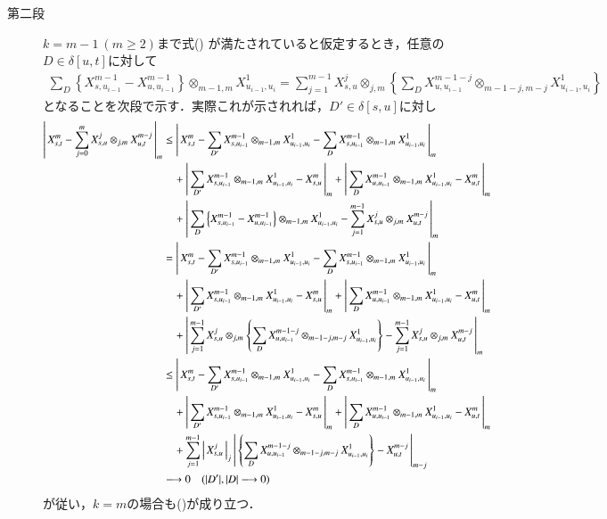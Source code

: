 \begin{prf}
\begin{description}
			\item[第二段]
				$k=m-1\ (m \geq 2)$まで式()
				が満たされていると仮定するとき，任意の$D \in \delta[u,t]$に対して
				\begin{align}
					\sum_D \left\{ X^{m-1}_{s,u_{i-1}} - X^{m-1}_{u,u_{i-1}} \right\} \otimes_{m-1,m} X^1_{u_{i-1},u_i}
					= \sum_{j=1}^{m-1} X^j_{s,u} \otimes_{j,m} \left\{ \sum_D X^{m-1-j}_{u,u_{i-1}} \otimes_{m-1-j,m-j} X^1_{u_{i-1},u_i} \right\}
					\label{eq:thm_signature_of_path_multiplicative_2}
				\end{align}
				となることを次段で示す．実際これが示されれば，$D' \in \delta[s,u]$に対し
				\begin{align}
					\left|\, X^m_{s,t} - \sum_{j=0}^m X^j_{s,u} \otimes_{j,m} X^{m-j}_{u,t}\, \right|_{m}
					&\leq \left|\, X^m_{s,t} - \sum_{D'} X^{m-1}_{s,u_{i-1}} \otimes_{m-1,m} X^1_{u_{i-1},u_i} 
						- \sum_{D} X^{m-1}_{s,u_{i-1}} \otimes_{m-1,m} X^1_{u_{i-1},u_i}\, \right|_{m} \\
						&\quad+ \left|\, \sum_{D'} X^{m-1}_{s,u_{i-1}} \otimes_{m-1,m} X^1_{u_{i-1},u_i} - X^m_{s,u}\, \right|_{m}
						+ \left|\, \sum_{D} X^{m-1}_{u,u_{i-1}} \otimes_{m-1,m} X^1_{u_{i-1},u_i} - X^m_{u,t}\, \right|_{m} \\
						&\quad+ \left|\, \sum_D \left\{ X^{m-1}_{s,u_{i-1}} - X^{m-1}_{u,u_{i-1}} \right\} \otimes_{m-1,m} X^1_{u_{i-1},u_i} - 
						\sum_{j=1}^{m-1} X^j_{s,u} \otimes_{j,m} X^{m-j}_{u,t}\, \right|_{m} \\
					&= \left|\, X^m_{s,t} - \sum_{D'} X^{m-1}_{s,u_{i-1}} \otimes_{m-1,m} X^1_{u_{i-1},u_i} 
						- \sum_{D} X^{m-1}_{s,u_{i-1}} \otimes_{m-1,m} X^1_{u_{i-1},u_i}\, \right|_{m} \\
						&\quad+ \left|\, \sum_{D'} X^{m-1}_{s,u_{i-1}} \otimes_{m-1,m} X^1_{u_{i-1},u_i} - X^m_{s,u}\, \right|_{m}
						+ \left|\, \sum_{D} X^{m-1}_{u,u_{i-1}} \otimes_{m-1,m} X^1_{u_{i-1},u_i} - X^m_{u,t}\, \right|_{m} \\
						&\quad+ \left|\, \sum_{j=1}^{m-1} X^j_{s,u} \otimes_{j,m} \left\{ \sum_D X^{m-1-j}_{u,u_{i-1}} \otimes_{m-1-j,m-j} X^1_{u_{i-1},u_i} \right\} 
						- \sum_{j=1}^{m-1} X^j_{s,u} \otimes_{j,m} X^{m-j}_{u,t}\, \right|_{m} \\
					&\leq \left|\, X^m_{s,t} - \sum_{D'} X^{m-1}_{s,u_{i-1}} \otimes_{m-1,m} X^1_{u_{i-1},u_i} 
						- \sum_{D} X^{m-1}_{s,u_{i-1}} \otimes_{m-1,m} X^1_{u_{i-1},u_i}\, \right|_{m} \\
						&\quad+ \left|\, \sum_{D'} X^{m-1}_{s,u_{i-1}} \otimes_{m-1,m} X^1_{u_{i-1},u_i} - X^m_{s,u}\, \right|_{m}
						+ \left|\, \sum_{D} X^{m-1}_{u,u_{i-1}} \otimes_{m-1,m} X^1_{u_{i-1},u_i} - X^m_{u,t}\, \right|_{m} \\
						&\quad+  \sum_{j=1}^{m-1} \left|\, X^j_{s,u}\, \right|_{j} 
						\left|\, \left\{ \sum_D X^{m-1-j}_{u,u_{i-1}} \otimes_{m-1-j,m-j} X^1_{u_{i-1},u_i} \right\} - X^{m-j}_{u,t}\, \right|_{m-j} \\
					&\longrightarrow 0 \quad (|D'|,|D| \longrightarrow 0)
				\end{align}
				が従い，$k=m$の場合も()が成り立つ．
				

\end{description}
\end{prf}
